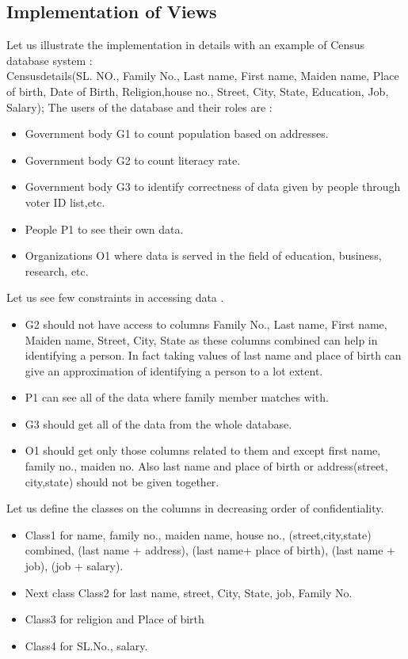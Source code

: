 \documentclass[11pt,a4paper]{report}
\begin{document}
\subsection{Implementation of Views}
Let us illustrate the implementation in details with an example of Census database system : \\
Census\textunderscore details(SL. NO., Family No., Last name, First name, Maiden name, Place of birth, Date of Birth, Religion,house no., Street, City, State, Education, Job, Salary);
The users of the database and their roles are : 
\begin{itemize}
    \item Government body G1 to count population based on addresses.
    \item Government body G2 to count literacy rate. 
    \item Government body G3 to identify correctness of data given by people through voter ID list,etc.
    \item People P1 to see their own data.
    \item Organizations O1 where data is served in the field of education, business, research, etc.
\end{itemize}
Let us see few constraints in accessing data . 
\begin{itemize}
    \item G2 should not have access to columns Family No., Last name, First name, Maiden name, Street, City, State as these columns combined can help in identifying a person. In fact taking values of last name and place of birth can give an approximation of identifying a person to a lot extent.
    \item P1 can see all of the data where family member matches with.
    \item G3 should get all of the data from the whole database.
    \item O1 should get only those columns related to them and except first name,  family no., maiden no. Also last name and place of birth or address(street, city,state) should not be given together.
\end{itemize}  
\newpage
Let us define the classes on the columns in decreasing order of confidentiality. 
\begin{itemize}
    \item Class1 for name, family no., maiden name, house no., (street,city,state) combined, (last name + address), (last name+ place of birth), (last name + job), (job + salary).
    \item Next class Class2 for last name, street, City, State, job, Family No.
    \item Class3 for religion and Place of birth
    \item Class4 for SL.No., salary.
\end{itemize}
\end{document}
